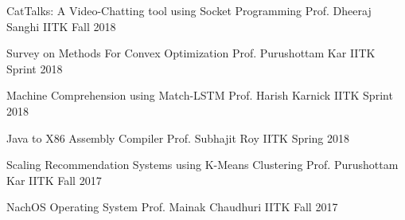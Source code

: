 
\begin{cvhonors}

	\cvhonor
	{CatTalks: A Video-Chatting tool using Socket Programming}
	{Prof. Dheeraj Sanghi}
	{IITK}
	{Fall 2018}

	\cvhonor
	{Survey on Methods For Convex Optimization}
	{Prof. Purushottam Kar}
	{IITK}
	{Sprint 2018}
	
	\cvhonor
	{Machine Comprehension using Match-LSTM}
	{Prof. Harish Karnick}
	{IITK}
	{Sprint 2018}

	\cvhonor
	{Java to X86 Assembly Compiler}
	{Prof. Subhajit Roy}
	{IITK}
	{Spring 2018}

	\cvhonor
	{Scaling Recommendation Systems using K-Means Clustering}
	{Prof. Purushottam Kar}
	{IITK}
	{Fall 2017}

	\cvhonor
	{NachOS Operating System}
	{Prof. Mainak Chaudhuri}
	{IITK}
	{Fall 2017}

\end{cvhonors}
